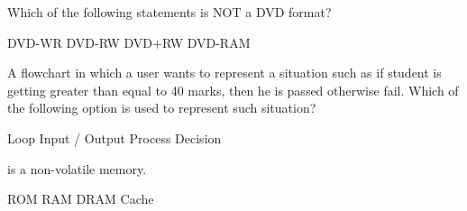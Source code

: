 \documentclass[a4paper]{exam}
\begin{document}
\begin{questions}
\question Which of the following statements is NOT a DVD format?

\begin{oneparchoices}
    \choice DVD-WR
    \choice DVD-RW
    \choice DVD+RW
    \choice DVD-RAM
\end{oneparchoices}

\question A flowchart in which a user wants to represent a situation such as if student is getting greater than equal to 40 marks, then he is passed otherwise fail. Which of the following option is used to represent such situation?

\begin{oneparchoices}
    \choice Loop
    \choice Input / Output
    \choice Process
    \choice Decision
\end{oneparchoices}

\question \fillin[100] is a non-volatile memory.

\begin{oneparchoices}
    \choice ROM
    \choice RAM
    \choice DRAM
    \choice Cache
\end{oneparchoices}

\end{questions}
\end{document}
